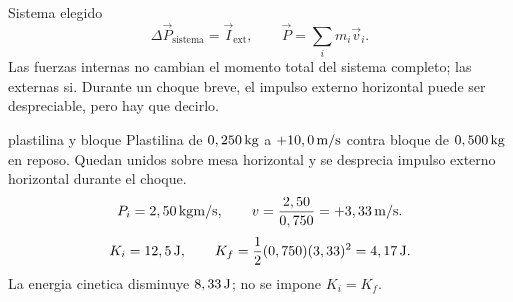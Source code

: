\documentclass[10pt,a4paper]{article}
\begin{document}
\clearpage

\begin{lessoncard}{Sistema elegido}
\[
\Delta\vec P_{\mathrm{sistema}}=\vec I_{\mathrm{ext}},\qquad \vec P=\sum_i m_i\vec v_i.
\]
Las fuerzas internas no cambian el momento total del sistema completo; las externas si. Durante un choque breve, el impulso externo horizontal puede ser despreciable, pero hay que decirlo.
\begin{center}
\end{center}
\end{lessoncard}

\begin{examplebox}{plastilina y bloque}
Plastilina de $0,250\,\mathrm{kg}$ a $+10,0\,\mathrm{m/s}$ contra bloque de $0,500\,\mathrm{kg}$ en reposo. Quedan unidos sobre mesa horizontal y se desprecia impulso externo horizontal durante el choque.
\solutionblock
\[
P_i=2,50\,\mathrm{kg}\mathrm{m/s},\qquad v=\frac{2,50}{0,750}=+3,33\,\mathrm{m/s}.
\]
\[
K_i=12,5\,\mathrm{J},\qquad K_f=\frac12(0,750)(3,33)^2=4,17\,\mathrm{J}.
\]
La energia cinetica disminuye $8,33\,\mathrm{J}$; no se impone $K_i=K_f$.
\end{examplebox}

\clearpage
\end{document}
